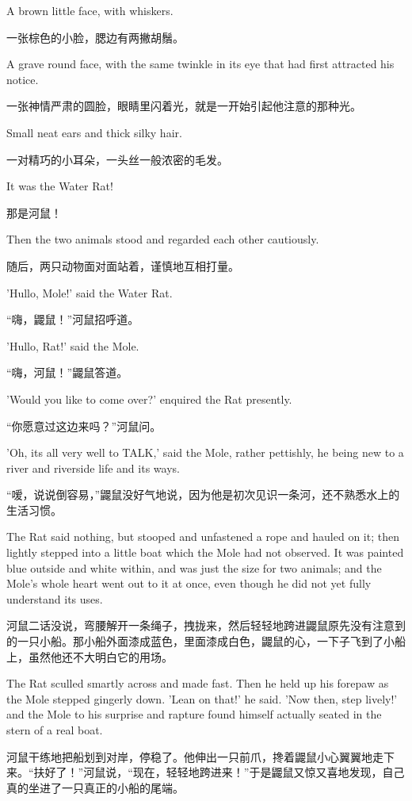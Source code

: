 {  	A brown little face, with whiskers.
  	
  	一张棕色的小脸，腮边有两撇胡鬚。
  	
  	A grave round face, with the same twinkle in its eye that had first attracted his notice.
  	
  	一张神情严肃的圆脸，眼睛里闪着光，就是一开始引起他注意的那种光。
  	
  	Small neat ears and thick silky hair.
  	
  	一对精巧的小耳朵，一头丝一般浓密的毛发。
  	
  	It was the Water Rat!
  	
  	那是河鼠！
  	
  	Then the two animals stood and regarded each other cautiously.
  	
  	随后，两只动物面对面站着，谨慎地互相打量。
  	
  	'Hullo, Mole!' said the Water Rat.
  	
  	“嗨，鼹鼠！”河鼠招呼道。
  	
  	'Hullo, Rat!' said the Mole.
  	
  	“嗨，河鼠！”鼹鼠答道。
  	
  	'Would you like to come over?' enquired the Rat presently.
  	
  	“你愿意过这边来吗？”河鼠问。
  	
  	'Oh, its all very well to TALK,' said the Mole, rather pettishly, he being new to a river and riverside life and its ways.
  	
  	“嗳，说说倒容易，”鼹鼠没好气地说，因为他是初次见识一条河，还不熟悉水上的生活习惯。
  	
  	The Rat said nothing, but stooped and unfastened a rope and hauled on it; then lightly stepped into a little boat which the Mole had not observed. It was painted blue outside and white within, and was just the size for two animals; and the Mole's whole heart went out to it at once, even though he did not yet fully understand its uses.
  	
  	河鼠二话没说，弯腰解开一条绳子，拽拢来，然后轻轻地跨进鼹鼠原先没有注意到的一只小船。那小船外面漆成蓝色，里面漆成白色，鼹鼠的心，一下子飞到了小船上，虽然他还不大明白它的用场。
  	
  	The Rat sculled smartly across and made fast. Then he held up his forepaw as the Mole stepped gingerly down. 'Lean on that!' he said. 'Now then, step lively!' and the Mole to his surprise and rapture found himself actually seated in the stern of a real boat.
  	
  	河鼠干练地把船划到对岸，停稳了。他伸出一只前爪，搀着鼹鼠小心翼翼地走下来。“扶好了！”河鼠说，“现在，轻轻地跨进来！”于是鼹鼠又惊又喜地发现，自己真的坐进了一只真正的小船的尾端。}
